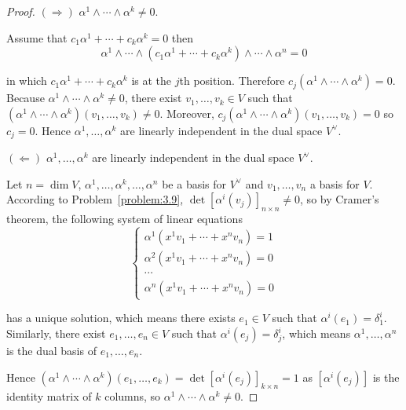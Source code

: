 \begin{proof}
	\( (\Longrightarrow) \) \( \alpha^{1} \land \cdots \land \alpha^{k} \neq 0 \).

	Assume that \( c_{1}\alpha^{1} + \cdots + c_{k}\alpha^{k} = 0 \) then
	\[
		\alpha^{1} \wedge \cdots \wedge (c_{1}\alpha^{1} + \cdots + c_{k}\alpha^{k}) \wedge \cdots \wedge \alpha^{n} = 0
	\]

	in which \( c_{1}\alpha^{1} + \cdots + c_{k}\alpha^{k} \) is at the \( j \)th position. Therefore \( c_{j} (\alpha^{1} \wedge \cdots \wedge \alpha^{k}) = 0 \). Because \( \alpha^{1} \wedge \cdots \wedge \alpha^{k} \ne 0 \), there exist \( v_{1}, \ldots, v_{k} \in V \) such that \( (\alpha^{1} \wedge \cdots \wedge \alpha^{k})(v_{1}, \ldots, v_{k}) \ne 0 \). Moreover, \( c_{j}(\alpha^{1} \wedge \cdots \wedge \alpha^{k})(v_{1}, \ldots, v_{k}) = 0 \) so \( c_{j} = 0 \). Hence \( \alpha^{1}, \ldots, \alpha^{k} \) are linearly independent in the dual space \( V^{\vee} \).

	\( (\Longleftarrow) \) \( \alpha^{1}, \ldots, \alpha^{k} \) are linearly independent in the dual space \( V^{\vee} \).

	Let \( n = \dim V \), \( \alpha^{1}, \ldots, \alpha^{k}, \ldots, \alpha^{n} \) be a basis for \( V^{\vee} \) and \( v_{1}, \ldots, v_{n} \) a basis for \( V \). According to Problem~\ref{problem:3.9}, \( \det{[\alpha^{i}(v_{j})]}_{n\times n} \ne 0 \), so by Cramer's theorem, the following system of linear equations
	\[
		\begin{cases}
			\alpha^{1}(x^{1}v_{1} + \cdots + x^{n}v_{n}) = 1 \\
			\alpha^{2}(x^{1}v_{1} + \cdots + x^{n}v_{n}) = 0 \\
			\cdots                                           \\
			\alpha^{n}(x^{1}v_{1} + \cdots + x^{n}v_{n}) = 0
		\end{cases}
	\]

	has a unique solution, which means there exists \( e_{1} \in V \) such that \( \alpha^{i}(e_{1}) = \delta^{i}_{1} \). Similarly, there exist \( e_{1}, \ldots, e_{n} \in V \) such that \( \alpha^{i}(e_{j}) = \delta^{i}_{j} \), which means \( \alpha^{1}, \ldots, \alpha^{n} \) is the dual basis of \( e_{1}, \ldots, e_{n} \).

	Hence \( (\alpha^{1} \wedge \cdots \wedge \alpha^{k})(e_{1}, \ldots, e_{k}) = \det{[\alpha^{i}(e_{j})]}_{k\times n} = 1 \) as \( [\alpha^{i}(e_{j})] \) is the identity matrix of \( k \) columns, so \( \alpha^{1} \wedge \cdots \wedge \alpha^{k} \ne 0 \).
\end{proof}

